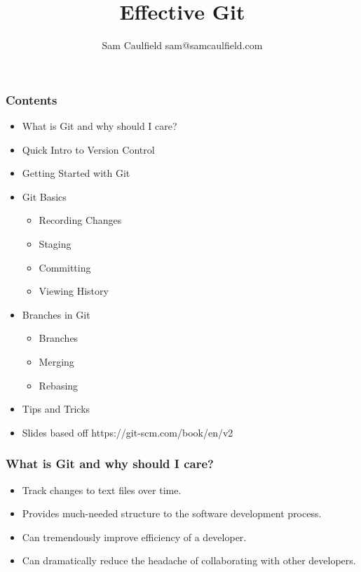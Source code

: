 \documentclass{beamer}
\title{Effective Git}
\author{Sam Caulfield \textlangle{}sam@samcaulfield.com\textrangle{}}
\date{}
\begin{document}
\frame{\titlepage}

\begin{frame}
	\frametitle{Contents}
	\begin{itemize}
		\item{What is Git and why should I care?}
		\item{Quick Intro to Version Control}
		\item{Getting Started with Git}
		\item{Git Basics}
		\begin{itemize}
			\item{Recording Changes}
			\item{Staging}
			\item{Committing}
			\item{Viewing History}
		\end{itemize}
		\item{Branches in Git}
		\begin{itemize}
			\item{Branches}
			\item{Merging}
			\item{Rebasing}
		\end{itemize}
		\item{Tips and Tricks}
		\item{Slides based off https://git-scm.com/book/en/v2}
	\end{itemize}

\end{frame}


\begin{frame}
	\frametitle{What is Git and why should I care?}
	\begin{itemize}
		\item{Track changes to text files over time.}
		\item{Provides much-needed structure to the software development process.}
		\item{Can tremendously improve efficiency of a developer.}
		\item{Can dramatically reduce the headache of collaborating with other developers.}
	\end{itemize}

\end{frame}
\end{document}
